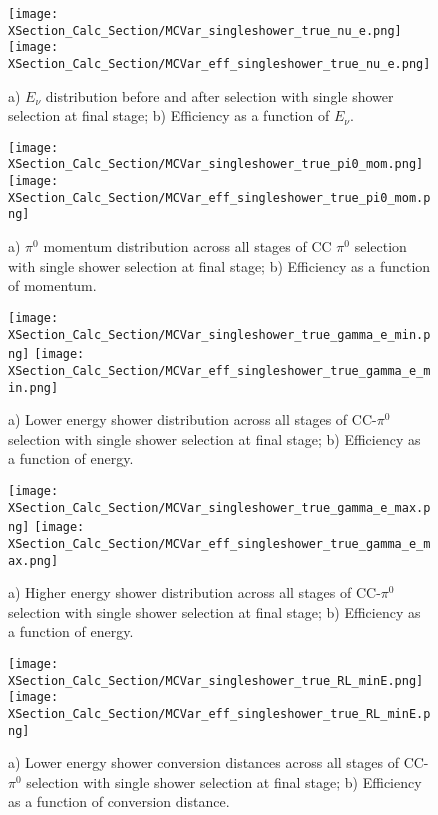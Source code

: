 \begin{figure}[h!]
\centering
\texttt{[image: XSection\_Calc\_Section/MCVar\_singleshower\_true\_nu\_e.png]}
\hspace{1 mm}
\texttt{[image: XSection\_Calc\_Section/MCVar\_eff\_singleshower\_true\_nu\_e.png]}
\caption{a) $E_\nu$ distribution before and after selection with single shower selection at final stage; b) Efficiency as a function of $E_\nu$. }
\label{fig:pi0_effs_7}
\end{figure}

\begin{figure}[h!]
\centering
\texttt{[image: XSection\_Calc\_Section/MCVar\_singleshower\_true\_pi0\_mom.png]}
\hspace{1 mm}
\texttt{[image: XSection\_Calc\_Section/MCVar\_eff\_singleshower\_true\_pi0\_mom.png]}
\caption{a) $\pi^0$ momentum distribution across all stages of CC $\pi^0$ selection with single shower selection at final stage; b) Efficiency as a function of momentum. }
\label{fig:pi0_effs_8}
\end{figure}

\begin{figure}[h!]
\centering
\texttt{[image: XSection\_Calc\_Section/MCVar\_singleshower\_true\_gamma\_e\_min.png]}
\hspace{1 mm}
\texttt{[image: XSection\_Calc\_Section/MCVar\_eff\_singleshower\_true\_gamma\_e\_min.png]}
\caption{a) Lower energy shower distribution across all stages of CC-$\pi^0$ selection with single shower selection at final stage; b) Efficiency as a function of energy. }
\label{fig:pi0_effs_9}
\end{figure}

\begin{figure}[h!]
\centering
\texttt{[image: XSection\_Calc\_Section/MCVar\_singleshower\_true\_gamma\_e\_max.png]}
\hspace{1 mm}
\texttt{[image: XSection\_Calc\_Section/MCVar\_eff\_singleshower\_true\_gamma\_e\_max.png]}
\caption{a) Higher energy shower distribution across all stages of CC-$\pi^0$ selection with single shower selection at final stage; b) Efficiency as a function of energy. }
\label{fig:pi0_effs_10}
\end{figure}

\begin{figure}[h!]
\centering
\texttt{[image: XSection\_Calc\_Section/MCVar\_singleshower\_true\_RL\_minE.png]}
\hspace{1 mm}
\texttt{[image: XSection\_Calc\_Section/MCVar\_eff\_singleshower\_true\_RL\_minE.png]}
\caption{a) Lower energy shower conversion distances across all stages of CC-$\pi^0$ selection with single shower selection at final stage; b) Efficiency as a function of conversion distance. }
\label{fig:pi0_effs_11}
\end{figure}

